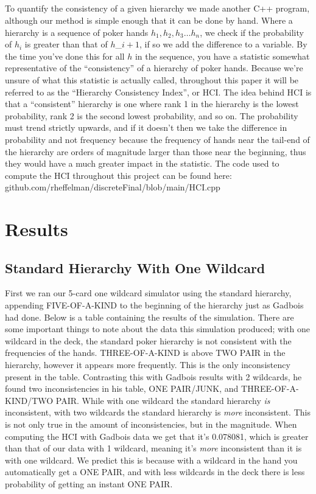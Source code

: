 \documentclass[16pt]{article}
\begin{document}
\subsection{}
To quantify the consistency of a given hierarchy we made another C++ program, although our method is simple enough that it can be done by hand. Where a hierarchy is a sequence of poker hands $h_1, h_2, h_3 … h_n$, we check if the probability of $h_i$ is greater than that of $h$_\(i+1\), if so we add the difference to a variable. By the time you’ve done this for all $h$ in the sequence, you have a statistic somewhat representative of the “consistency” of a hierarchy of poker hands. Because we're unsure of what this statistic is actually called, throughout this paper it will be referred to as the ``Hierarchy Consistency Index'', or HCI. The idea behind HCI is that a ``consistent'' hierarchy is one where rank 1 in the hierarchy is the lowest probability, rank 2 is the second lowest probability, and so on. The probability must trend strictly upwards, and if it doesn't then we take the difference in probability and not frequency because the frequency of hands near the tail-end of the hierarchy are orders of magnitude larger than those near the beginning, thus they would have a much greater impact in the statistic. The code used to compute the HCI throughout this project can be found here: \\github.com/rheffelman/discreteFinal/blob/main/HCI.cpp


\section{Results}
\subsection{Standard Hierarchy With One Wildcard}
First we ran our 5-card one wildcard simulator using the standard hierarchy, appending FIVE-OF-A-KIND to the beginning of the hierarchy just as Gadbois had done. Below is a table containing the results of the simulation. There are some important things to note about the data this simulation produced; with one wildcard in the deck, the standard poker hierarchy is not consistent with the frequencies of the hands. THREE-OF-A-KIND is above TWO PAIR in the hierarchy, however it appears more frequently. This is the only inconsistency present in the table. Contrasting this with Gadbois results with 2 wildcards, he found two inconsistencies in his table, ONE PAIR/JUNK, and THREE-OF-A-KIND/TWO PAIR. While with one wildcard the standard hierarchy \textit{is} inconsistent, with two wildcards the standard hierarchy is \textit{more} inconsistent. This is not only true in the amount of inconsistencies, but in the magnitude. When computing the HCI with Gadbois data we get that it's 0.078081, which is greater than that of our data with 1 wildcard, meaning it's \textit{more} inconsistent than it is with one wildcard. We predict this is because with a wildcard in the hand you automatically get a ONE PAIR, and with less wildcards in the deck there is less probability of getting an instant ONE PAIR.
\end{document}
